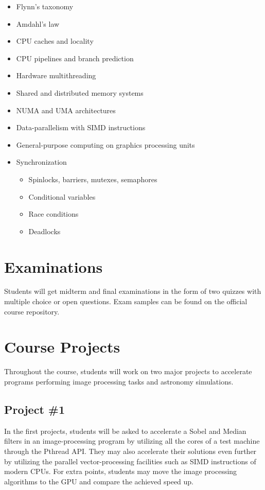 \documentclass[12pt,a4paper,oneside]{article}
\begin{document}
        \begin{itemize}
        \item Flynn's taxonomy
        \item Amdahl’s law
        \item CPU caches and locality
        \item CPU pipelines and branch prediction
        \item Hardware multithreading
        \item Shared and distributed memory systems
        \item NUMA and UMA architectures
        \item Data-parallelism with SIMD instructions
        \item General-purpose computing on graphics processing units
        \item Synchronization
        \begin{itemize}
          \item Spinlocks, barriers, mutexes, semaphores
          \item Conditional variables
          \item Race conditions
          \item Deadlocks
        \end{itemize}
        \end{itemize}

    \section{Examinations}

        Students will get midterm and final examinations in the form of two
        quizzes with multiple choice or open questions. Exam samples can be
        found on the official course repository.

    \section{Course Projects}

        Throughout the course, students will work on two major projects to
        accelerate programs performing image processing tasks and astronomy
        simulations.

        \subsection{Project \#1}

            In the first projects, students will be asked to accelerate a Sobel
            and Median filters in an image-processing program by utilizing all
            the cores of a test machine through the Pthread API. They may also
            accelerate their solutions even further by utilizing the parallel
            vector-processing facilities such as SIMD instructions of modern
            CPUs. For extra points, students may move the image processing
            algorithms to the GPU and compare the achieved speed up.
\end{document}
